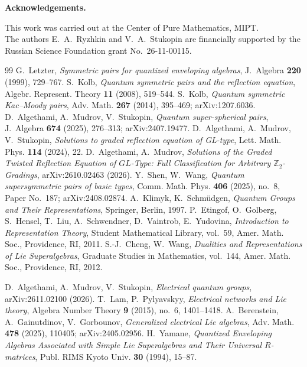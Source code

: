 \documentclass[12pt,a4paper]{article}
\begin{document}
\vspace{0.5cm}


\textbf{Acknowledgements.}


\medskip
This work was carried out at the Center of Pure Mathematics, MIPT.  \\
The authors E.~A.~Ryzhkin and V.~A.~Stukopin are financially supported by the Russian Science Foundation grant No.~26-11-00115.




\begin{thebibliography}{99}
 G.~Letzter, \emph{Symmetric pairs for quantized enveloping algebras}, J.~Algebra \textbf{220} (1999), 729--767.
 S.~Kolb, \emph{Quantum symmetric pairs and the reflection equation}, Algebr. Represent. Theory \textbf{11} (2008), 519--544.
 S.~Kolb, \emph{Quantum symmetric Kac--Moody pairs}, Adv. Math. \textbf{267} (2014), 395--469; arXiv:1207.6036.
 D.~Algethami, A.~Mudrov, V.~Stukopin, \emph{Quantum super-spherical pairs}, J.~Algebra \textbf{674} (2025), 276--313; arXiv:2407.19477.
 D.~Algethami, A.~Mudrov, V.~Stukopin, \emph{Solutions to graded reflection equation of GL-type}, Lett. Math. Phys. \textbf{114} (2024), 22.
 D.~Algethami, A.~Mudrov, \emph{Solutions of the Graded Twisted Reflection Equation of $GL$-Type: Full Classification for Arbitrary $\mathbb Z_2$-Gradings}, arXiv:2610.02463 (2026).
 Y.~Shen, W.~Wang, \emph{Quantum supersymmetric pairs of basic types}, Comm. Math. Phys. \textbf{406} (2025), no.~8, Paper No.~187; arXiv:2408.02874.
 A.~Klimyk, K.~Schm\"udgen, \emph{Quantum Groups and Their Representations}, Springer, Berlin, 1997.
 P.~Etingof, O.~Golberg, S.~Hensel, T.~Liu, A.~Schwendner, D.~Vaintrob, E.~Yudovina, \emph{Introduction to Representation Theory}, Student Mathematical Library, vol.~59, Amer. Math. Soc., Providence, RI, 2011.
 S.-J.~Cheng, W.~Wang, \emph{Dualities and Representations of Lie Superalgebras}, Graduate Studies in Mathematics, vol.~144, Amer. Math. Soc., Providence, RI, 2012.

 D.~Algethami, A.~Mudrov, V.~Stukopin, \emph{Electrical quantum groups}, arXiv:2611.02100 (2026).
 T.~Lam, P.~Pylyavskyy, \emph{Electrical networks and Lie theory}, Algebra Number Theory \textbf{9} (2015), no.~6, 1401--1418.
 A.~Berenstein, A.~Gainutdinov, V.~Gorbounov, \emph{Generalized electrical Lie algebras}, Adv. Math. \textbf{478} (2025), 110405; arXiv:2405.02956.
 H.~Yamane, \emph{Quantized Enveloping Algebras Associated with Simple Lie Superalgebras and Their Universal $R$-matrices}, Publ. RIMS Kyoto Univ. \textbf{30} (1994), 15--87.
\end{thebibliography}
\end{document}
